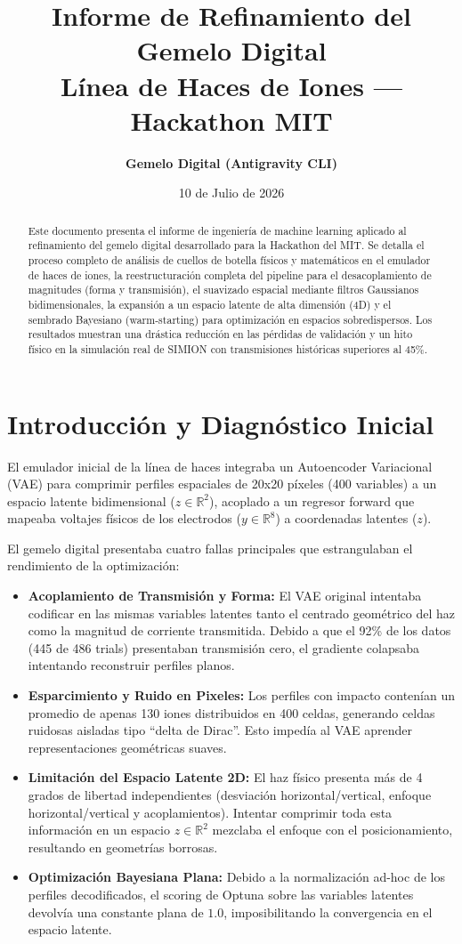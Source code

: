 \documentclass[11pt,spanish]{article}
\title{\textbf{Informe de Refinamiento del Gemelo Digital} \\ \large Línea de Haces de Iones --- Hackathon MIT}
\author{\textbf{Gemelo Digital (Antigravity CLI)}}
\date{10 de Julio de 2026}
\begin{document}
\maketitle

\begin{abstract}
Este documento presenta el informe de ingeniería de machine learning aplicado al refinamiento del gemelo digital desarrollado para la Hackathon del MIT. Se detalla el proceso completo de análisis de cuellos de botella físicos y matemáticos en el emulador de haces de iones, la reestructuración completa del pipeline para el desacoplamiento de magnitudes (forma y transmisión), el suavizado espacial mediante filtros Gaussianos bidimensionales, la expansión a un espacio latente de alta dimensión (4D) y el sembrado Bayesiano (warm-starting) para optimización en espacios sobredispersos. Los resultados muestran una drástica reducción en las pérdidas de validación y un hito físico en la simulación real de SIMION con transmisiones históricas superiores al 45\%.
\end{abstract}

\section{Introducción y Diagnóstico Inicial}
El emulador inicial de la línea de haces integraba un Autoencoder Variacional (VAE) para comprimir perfiles espaciales de 20x20 píxeles (400 variables) a un espacio latente bidimensional ($z \in \mathbb{R}^2$), acoplado a un regresor forward que mapeaba voltajes físicos de los electrodos ($y \in \mathbb{R}^8$) a coordenadas latentes ($z$). 

El gemelo digital presentaba cuatro fallas principales que estrangulaban el rendimiento de la optimización:
\begin{itemize}
    \item \textbf{Acoplamiento de Transmisión y Forma:} El VAE original intentaba codificar en las mismas variables latentes tanto el centrado geométrico del haz como la magnitud de corriente transmitida. Debido a que el 92\% de los datos (445 de 486 trials) presentaban transmisión cero, el gradiente colapsaba intentando reconstruir perfiles planos.
    \item \textbf{Esparcimiento y Ruido en Pixeles:} Los perfiles con impacto contenían un promedio de apenas 130 iones distribuidos en 400 celdas, generando celdas ruidosas aisladas tipo ``delta de Dirac''. Esto impedía al VAE aprender representaciones geométricas suaves.
    \item \textbf{Limitación del Espacio Latente 2D:} El haz físico presenta más de 4 grados de libertad independientes (desviación horizontal/vertical, enfoque horizontal/vertical y acoplamientos). Intentar comprimir toda esta información en un espacio $z \in \mathbb{R}^2$ mezclaba el enfoque con el posicionamiento, resultando en geometrías borrosas.
    \item \textbf{Optimización Bayesiana Plana:} Debido a la normalización ad-hoc de los perfiles decodificados, el scoring de Optuna sobre las variables latentes devolvía una constante plana de $1.0$, imposibilitando la convergencia en el espacio latente.
\end{itemize}
\end{document}
